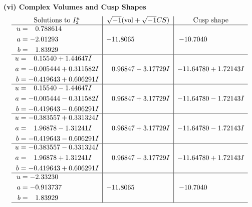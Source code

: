 \documentclass[1p]{elsarticle_modified}
\theoremstyle{definition}
\newcommand{\I}{\sqrt{-1}}
\begin{document}
\newpage\flushleft \textbf{(vi) Complex Volumes and Cusp Shapes}
$$\begin{array}{c|c|c}  
\text{Solutions to }I^u_{2}& \I (\text{vol} + \sqrt{-1}CS) & \text{Cusp shape}\\
 \hline 
\begin{aligned}
u &= \phantom{-}0.788614\phantom{ +0.000000I} \\
a &= -2.01293\phantom{ +0.000000I} \\
b &= \phantom{-}1.83929\phantom{ +0.000000I}\end{aligned}
 & -11.8065\phantom{ +0.000000I} & -10.7040\phantom{ +0.000000I} \\ \hline\begin{aligned}
u &= \phantom{-}0.15540 + 1.44647 I \\
a &= -0.005444 + 0.311582 I \\
b &= -0.419643 + 0.606291 I\end{aligned}
 & \phantom{-}0.96847 - 3.17729 I & -11.64780 + 1.72143 I \\ \hline\begin{aligned}
u &= \phantom{-}0.15540 - 1.44647 I \\
a &= -0.005444 - 0.311582 I \\
b &= -0.419643 - 0.606291 I\end{aligned}
 & \phantom{-}0.96847 + 3.17729 I & -11.64780 - 1.72143 I \\ \hline\begin{aligned}
u &= -0.383557 + 0.331324 I \\
a &= \phantom{-}1.96878 - 1.31241 I \\
b &= -0.419643 - 0.606291 I\end{aligned}
 & \phantom{-}0.96847 + 3.17729 I & -11.64780 - 1.72143 I \\ \hline\begin{aligned}
u &= -0.383557 - 0.331324 I \\
a &= \phantom{-}1.96878 + 1.31241 I \\
b &= -0.419643 + 0.606291 I\end{aligned}
 & \phantom{-}0.96847 - 3.17729 I & -11.64780 + 1.72143 I \\ \hline\begin{aligned}
u &= -2.33230\phantom{ +0.000000I} \\
a &= -0.913737\phantom{ +0.000000I} \\
b &= \phantom{-}1.83929\phantom{ +0.000000I}\end{aligned}
 & -11.8065\phantom{ +0.000000I} & -10.7040\phantom{ +0.000000I}\\
 \hline 
 \end{array}$$\newpage\newpage\renewcommand{\arraystretch}{1}
\end{document}
